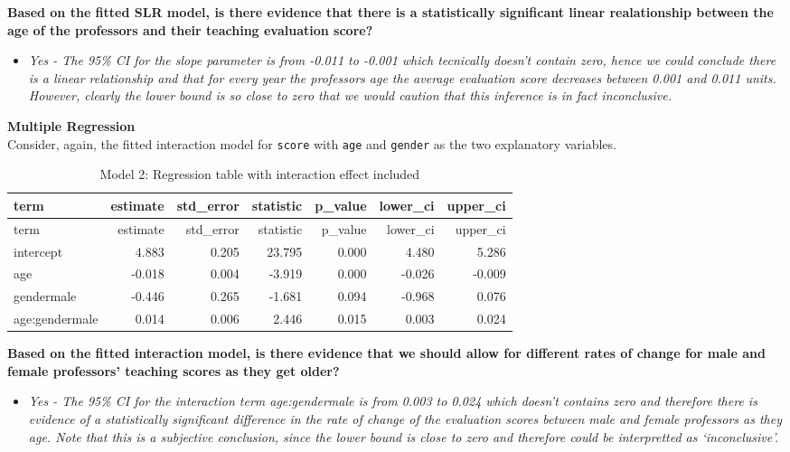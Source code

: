\documentclass[]{article}
\providecommand{\tightlist}{%
  \setlength{\itemsep}{0pt}\setlength{\parskip}{0pt}}
\begin{document}
\textbf{Based on the fitted SLR model, is there evidence that there is a
statistically significant linear realationship between the age of the
professors and their teaching evaluation score?}

\begin{itemize}
\tightlist
\item
  \emph{Yes - The 95\% CI for the slope parameter is from -0.011 to
  -0.001 which tecnically doesn't contain zero, hence we could conclude
  there is a linear relationship and that for every year the professors
  age the average evaluation score decreases between 0.001 and 0.011
  units. However, clearly the lower bound is so close to zero that we
  would caution that this inference is in fact inconclusive.}
\end{itemize}

\textbf{Multiple Regression}\\
Consider, again, the fitted interaction model for \texttt{score} with
\texttt{age} and \texttt{gender} as the two explanatory variables.

\begin{longtable}[]{@{}lrrrrrr@{}}
\caption{Model 2: Regression table with interaction effect
included}\tabularnewline
\toprule
term & estimate & std\_error & statistic & p\_value & lower\_ci &
upper\_ci\tabularnewline
\midrule
\endfirsthead
\toprule
term & estimate & std\_error & statistic & p\_value & lower\_ci &
upper\_ci\tabularnewline
\midrule
\endhead
intercept & 4.883 & 0.205 & 23.795 & 0.000 & 4.480 &
5.286\tabularnewline
age & -0.018 & 0.004 & -3.919 & 0.000 & -0.026 & -0.009\tabularnewline
gendermale & -0.446 & 0.265 & -1.681 & 0.094 & -0.968 &
0.076\tabularnewline
age:gendermale & 0.014 & 0.006 & 2.446 & 0.015 & 0.003 &
0.024\tabularnewline
\bottomrule
\end{longtable}

\textbf{Based on the fitted interaction model, is there evidence that we
should allow for different rates of change for male and female
professors' teaching scores as they get older?}

\begin{itemize}
\tightlist
\item
  \emph{Yes - The 95\% CI for the interaction term age:gendermale is
  from 0.003 to 0.024 which doesn't contains zero and therefore there is
  evidence of a statistically significant difference in the rate of
  change of the evaluation scores between male and female professors as
  they age. Note that this is a subjective conclusion, since the lower
  bound is close to zero and therefore could be interpretted as
  `inconclusive'.}
\end{itemize}
\end{document}
